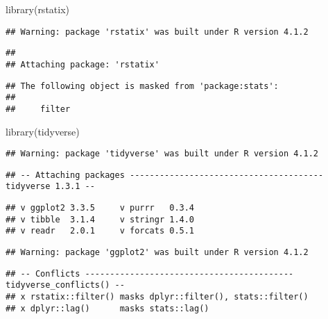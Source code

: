 \documentclass[
]{article}
\newenvironment{Shaded}{\begin{snugshade}}{\end{snugshade}}
\newcommand{\FunctionTok}[1]{\textcolor[rgb]{0.00,0.00,0.00}{#1}}
\newcommand{\NormalTok}[1]{#1}
\begin{document}
\begin{Shaded}
\begin{Highlighting}[]
\FunctionTok{library}\NormalTok{(rstatix)}
\end{Highlighting}
\end{Shaded}

\begin{verbatim}
## Warning: package 'rstatix' was built under R version 4.1.2
\end{verbatim}

\begin{verbatim}
## 
## Attaching package: 'rstatix'
\end{verbatim}

\begin{verbatim}
## The following object is masked from 'package:stats':
## 
##     filter
\end{verbatim}

\begin{Shaded}
\begin{Highlighting}[]
\FunctionTok{library}\NormalTok{(tidyverse)}
\end{Highlighting}
\end{Shaded}

\begin{verbatim}
## Warning: package 'tidyverse' was built under R version 4.1.2
\end{verbatim}

\begin{verbatim}
## -- Attaching packages --------------------------------------- tidyverse 1.3.1 --
\end{verbatim}

\begin{verbatim}
## v ggplot2 3.3.5     v purrr   0.3.4
## v tibble  3.1.4     v stringr 1.4.0
## v readr   2.0.1     v forcats 0.5.1
\end{verbatim}

\begin{verbatim}
## Warning: package 'ggplot2' was built under R version 4.1.2
\end{verbatim}

\begin{verbatim}
## -- Conflicts ------------------------------------------ tidyverse_conflicts() --
## x rstatix::filter() masks dplyr::filter(), stats::filter()
## x dplyr::lag()      masks stats::lag()
\end{verbatim}
\end{document}
